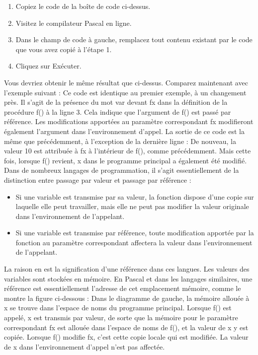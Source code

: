 \begin{enumerate}
\item Copiez le code de la boîte de code ci-dessus.
\item Visitez le compilateur Pascal en ligne.
\item Dans le champ de code à gauche, remplacez tout contenu existant par le code que vous avez copié à l'étape 1.
\item Cliquez sur Exécuter.
\end{enumerate}
Vous devriez obtenir le même résultat que ci-dessus.
Comparez maintenant avec l'exemple suivant :
Ce code est identique au premier exemple, à un changement près. Il s'agit de la présence du mot var devant fx dans la définition de la procédure f() à la ligne 3.  Cela indique que l'argument de f() est passé par référence.  Les modifications apportées au paramètre correspondant fx modifieront également l'argument dans l'environnement d'appel.
La sortie de ce code est la même que précédemment, à l'exception de la dernière ligne :
De nouveau, la valeur 10 est attribuée à fx à l'intérieur de f(), comme précédemment.  Mais cette fois, lorsque f() revient, x dans le programme principal a également été modifié.
Dans de nombreux langages de programmation, il s'agit essentiellement de la distinction entre passage par valeur et passage par référence :
\begin{itemize}
\item Si une variable est transmise par sa valeur, la fonction dispose d'une copie sur laquelle elle peut travailler, mais elle ne peut pas modifier la valeur originale dans l'environnement de l'appelant.
\item Si une variable est transmise par référence, toute modification apportée par la fonction au paramètre correspondant affectera la valeur dans l'environnement de l'appelant.
\end{itemize}
La raison en est la signification d'une référence dans ces langues.  Les valeurs des variables sont stockées en mémoire. En Pascal et dans les langages similaires, une référence est essentiellement l'adresse de cet emplacement mémoire, comme le montre la figure ci-dessous :
Dans le diagramme de gauche, la mémoire allouée à x se trouve dans l'espace de noms du programme principal.  Lorsque f() est appelé, x est transmis par valeur, de sorte que la mémoire pour le paramètre correspondant fx est allouée dans l'espace de noms de f(), et la valeur de x y est copiée.  Lorsque f() modifie fx, c'est cette copie locale qui est modifiée.  La valeur de x dans l'environnement d'appel n'est pas affectée.
